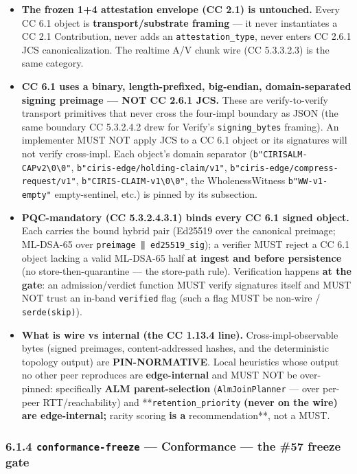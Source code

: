 \documentclass[11pt]{article}
\begin{document}
\begin{itemize}\setlength\itemsep{0pt}
\item \textbf{The frozen 1+4 attestation envelope (CC 2.1) is untouched.} Every CC 6.1 object is \textbf{transport/substrate framing} — it never instantiates a CC 2.1 Contribution, never adds an \texttt{attestation\_type}, never enters CC 2.6.1 JCS canonicalization. The realtime A/V chunk wire (CC 5.3.3.2.3) is the same category.
\item \textbf{CC 6.1 uses a binary, length-prefixed, big-endian, domain-separated signing preimage — NOT CC 2.6.1 JCS.} These are verify-to-verify transport primitives that never cross the four-impl boundary as JSON (the same boundary CC 5.3.2.4.2 drew for Verify's \texttt{signing\_bytes} framing). An implementer MUST NOT apply JCS to a CC 6.1 object or its signatures will not verify cross-impl. Each object's domain separator (\texttt{b"CIRISALM-CAPv2\textbackslash{}0\textbackslash{}0"}, \texttt{b"ciris-edge/holding-claim/v1"}, \texttt{b"ciris-edge/compress-request/v1"}, \texttt{b"CIRIS-CLAIM-v1\textbackslash{}0\textbackslash{}0"}, the WholenessWitness \texttt{b"WW-v1-empty"} empty-sentinel, etc.) is pinned by its subsection.
\item \textbf{PQC-mandatory (CC 5.3.2.4.3.1) binds every CC 6.1 signed object.} Each carries the bound hybrid pair (Ed25519 over the canonical preimage; ML-DSA-65 over \texttt{preimage ‖ ed25519\_sig}); a verifier MUST reject a CC 6.1 object lacking a valid ML-DSA-65 half \textbf{at ingest and before persistence} (no store-then-quarantine — the store-path rule). Verification happens \textbf{at the gate}: an admission/verdict function MUST verify signatures itself and MUST NOT trust an in-band \texttt{verified} flag (such a flag MUST be non-wire / \texttt{serde(skip)}).
\item \textbf{What is wire vs internal (the CC 1.13.4 line).} Cross-impl-observable bytes (signed preimages, content-addressed hashes, and the deterministic topology output) are \textbf{PIN-NORMATIVE}. Local heuristics whose output no other peer reproduces are \textbf{edge-internal} and MUST NOT be over-pinned: specifically \textbf{ALM parent-selection} (\texttt{AlmJoinPlanner} — over per-peer RTT/reachability) and **\texttt{retention\_priority}\textbf{ (never on the wire) are edge-internal; }rarity scoring\textbf{ is a }recommendation**, not a MUST.
\end{itemize}


\subsubsection*{6.1.4 \texttt{conformance-freeze} — Conformance — the \#57 freeze gate}
\end{document}
